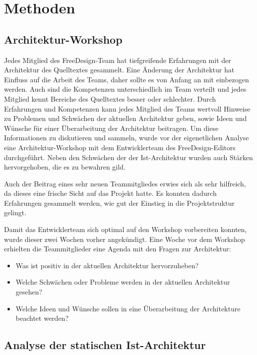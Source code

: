 \chapter{Methoden}

\section{Architektur-Workshop}
Jedes Mitglied des FreeDesign-Team hat tiefgreifende Erfahrungen mit der Architektur des Quelltextes gesammelt. %
Eine Änderung der Architektur hat Einfluss auf die Arbeit des Teams, daher sollte es von Anfang an mit einbezogen werden. 
Auch sind die Kompetenzen unterschiedlich im Team verteilt und jedes Mitglied kennt Bereiche des Quelltextes besser oder schlechter. 
Durch Erfahrungen und Kompetenzen kann jedes Mitglied des Teams wertvoll Hinweise zu Problemen und Schwächen der aktuellen Architektur geben, sowie Ideen und Wünsche für einer Überarbeitung der Architektur beitragen.
Um diese Informationen zu diskutieren und sammeln, wurde vor der eigenetlichen Analyse eine Architektur-Workshop mit dem Entwicklerteam des FreeDesign-Editors durchgeführt. Neben den Schwächen der der Ist-Architektur wurden auch Stärken hervorgehoben, die es zu bewahren gild. 

Auch der Beitrag eines sehr neuen Teammitgliedes erwies sich als sehr hilfreich, da dieses eine frische Sicht auf das Projekt hatte. Es konnten dadurch Erfahrungen gesammelt werden, wie gut der Einstieg in die Projektstruktur gelingt. 

Damit das Entwicklerteam sich optimal auf den Workshop vorbereiten konnten, wurde dieser zwei Wochen vorher angekündigt. Eine Woche vor dem Workshop erhielten die Teammitglieder eine Agenda mit den Fragen zur Architektur:
\begin{itemize}
	\item Was ist positiv in der aktuellen Architektur hervorzuheben?
	\item Welche Schwächen oder Probleme werden in der aktuellen Architektur gesehen?
	\item Welche Ideen und Wünsche sollen in eine Überarbeitung der Architekture beachtet werden?
\end{itemize}


\section{Analyse der statischen Ist-Architektur}
